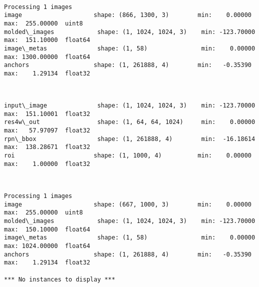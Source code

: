 \documentclass[11pt]{article}
\begin{document}
    \begin{center}
    \end{center}
    { \hspace*{\fill} \\}
    
    \begin{Verbatim}[commandchars=\\\{\}]
Processing 1 images
image                    shape: (866, 1300, 3)        min:    0.00000  max:  255.00000  uint8
molded\_images            shape: (1, 1024, 1024, 3)    min: -123.70000  max:  151.10000  float64
image\_metas              shape: (1, 58)               min:    0.00000  max: 1300.00000  float64
anchors                  shape: (1, 261888, 4)        min:   -0.35390  max:    1.29134  float32

    \end{Verbatim}

    \begin{center}
    \end{center}
    { \hspace*{\fill} \\}
    
    \begin{Verbatim}[commandchars=\\\{\}]
input\_image              shape: (1, 1024, 1024, 3)    min: -123.70000  max:  151.10001  float32
res4w\_out                shape: (1, 64, 64, 1024)     min:    0.00000  max:   57.97097  float32
rpn\_bbox                 shape: (1, 261888, 4)        min:  -16.18614  max:  138.28671  float32
roi                      shape: (1, 1000, 4)          min:    0.00000  max:    1.00000  float32

    \end{Verbatim}

    \begin{center}
    \end{center}
    { \hspace*{\fill} \\}
    
    \begin{Verbatim}[commandchars=\\\{\}]
Processing 1 images
image                    shape: (667, 1000, 3)        min:    0.00000  max:  255.00000  uint8
molded\_images            shape: (1, 1024, 1024, 3)    min: -123.70000  max:  150.10000  float64
image\_metas              shape: (1, 58)               min:    0.00000  max: 1024.00000  float64
anchors                  shape: (1, 261888, 4)        min:   -0.35390  max:    1.29134  float32

*** No instances to display *** 


    \end{Verbatim}
\end{document}
